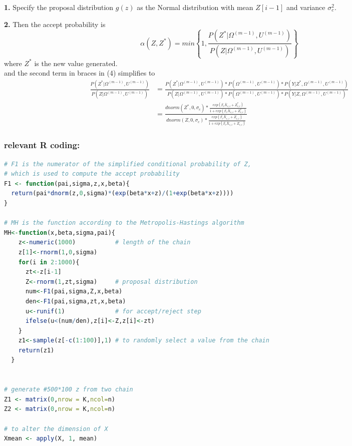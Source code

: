 \documentclass[10pt]{article}
\begin{document}
\begin{CJK}{UTF8}{gbsn}
\bigskip
\textbf{1.} Specify the proposal distribution $g(z)$ as the Normal distribution with mean $Z[i-1]$ and variance $\sigma^2_c$.

\textbf{2.} Then the accept probability is 
\begin{equation}
\alpha(Z,Z^*)=min\left\lbrace 1,\frac{P(Z^*|\Omega^{(m-1)},U^{(m-1)})}{P(Z|\Omega^{(m-1)},U^{(m-1)})}\right\rbrace
\end{equation}
\indent where $Z^*$ is the new value generated.
\\\indent and the second term in braces in (4) simplifies to
\begin{equation}
\begin{split}
\frac{P(Z^*|\Omega^{(m-1)},U^{(m-1)})}{P(Z|\Omega^{(m-1)},U^{(m-1)})}&=\frac{P(Z^*|\Omega^{(m-1)},U^{(m-1)})*P(\Omega^{(m-1)},U^{(m-1)})*P(Y|Z^*,\Omega^{(m-1)},U^{(m-1)})}{P(Z|\Omega^{(m-1)},U^{(m-1)})*P(\Omega^{(m-1)},U^{(m-1)})*P(Y|Z,\Omega^{(m-1)},U^{(m-1)})}\\&=\frac{dnorm(Z^*,0,\sigma_c)*\frac{exp(\beta_c\bar{X}_{c,i}+Z^*_{c,i})}{1+exp(\beta_c\bar{X}_{c,i}+Z^*_{c,i})}}{dnorm(Z,0,\sigma_c)*\frac{exp(\beta_c\bar{X}_{c,i}+Z_{c,i})}{1+exp(\beta_c\bar{X}_{c,i}+Z_{c,i})}}
\end{split}
\end{equation}
\bigskip
\subsubsection*{relevant R coding:}
\begin{lstlisting}[language=R]
# F1 is the numerator of the simplified conditional probability of Z,
# which is used to compute the accept probability
F1 <- function(pai,sigma,z,x,beta){
  return(pai*dnorm(z,0,sigma)*(exp(beta*x+z)/(1+exp(beta*x+z))))
}
  
# MH is the function according to the Metropolis-Hastings algorithm 
MH<-function(x,beta,sigma,pai){
    z<-numeric(1000)           # length of the chain
    z[1]<-rnorm(1,0,sigma)
    for(i in 2:1000){
      zt<-z[i-1]
      Z<-rnorm(1,zt,sigma)     # proposal distribution
      num<-F1(pai,sigma,Z,x,beta)
      den<-F1(pai,sigma,zt,x,beta)
      u<-runif(1)              # for accept/reject step
      ifelse(u<(num/den),z[i]<-Z,z[i]<-zt)
    }
    z1<-sample(z[-c(1:100)],1) # to randomly select a value from the chain
    return(z1)
  }


# generate #500*100 z from two chain
Z1 <- matrix(0,nrow = K,ncol=n)
Z2 <- matrix(0,nrow = K,ncol=n)

# to alter the dimension of X
Xmean <- apply(X, 1, mean)


\end{lstlisting}
\end{CJK}
\end{document}
